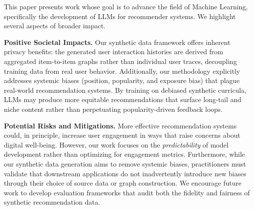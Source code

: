 \documentclass[]{fairmeta}
\begin{document}
  This paper presents work whose goal is to advance the field of Machine Learning, specifically the development of LLMs for recommender systems. We highlight several aspects of broader impact.

  \textbf{Positive Societal Impacts.} Our synthetic data framework offers inherent privacy benefits: the generated user interaction histories are derived from aggregated item-to-item graphs rather than individual user traces, decoupling training data from real user behavior. Additionally, our methodology explicitly addresses systemic biases (position, popularity, and exposure bias) that plague real-world recommendation systems. By training on debiased synthetic curricula, LLMs may produce more equitable recommendations that surface long-tail and niche content rather than perpetuating popularity-driven feedback loops.

  \textbf{Potential Risks and Mitigations.} More effective recommendation systems could, in principle, increase user engagement in ways that raise concerns about digital well-being. However, our work focuses on the \emph{predictability} of model development rather than optimizing for engagement metrics. Furthermore, while our synthetic data generation aims to remove systemic biases, practitioners must validate that downstream applications do not inadvertently introduce new biases through their choice of source data or graph construction. We encourage future work to develop evaluation frameworks that audit both the fidelity and fairness of synthetic recommendation data.


\clearpage
\newpage



\clearpage
\newpage
\beginappendix

\appendix
\end{document}
